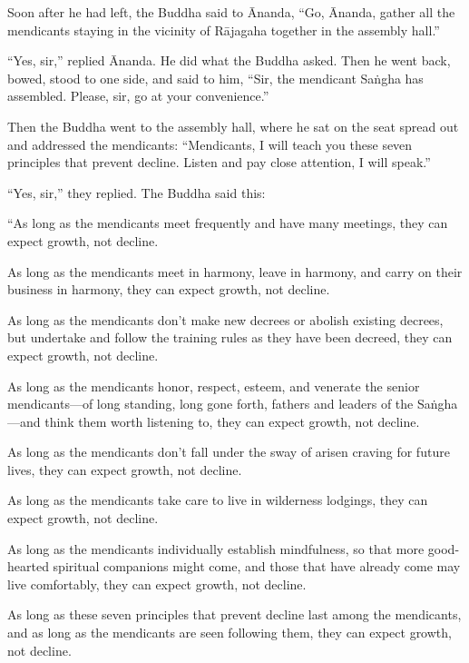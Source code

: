 \documentclass[12pt,openany]{book}%
\begin{document}
Soon after he had left, the Buddha said to Ānanda, “Go, Ānanda, gather all the mendicants staying in the vicinity of \textsanskrit{Rājagaha} together in the assembly hall.” 

“Yes, sir,” replied Ānanda. He did what the Buddha asked. Then he went back, bowed, stood to one side, and said to him, “Sir, the mendicant \textsanskrit{Saṅgha} has assembled. Please, sir, go at your convenience.” 

Then the Buddha went to the assembly hall, where he sat on the seat spread out and addressed the mendicants: “Mendicants, I will teach you these seven principles that prevent decline. Listen and pay close attention, I will speak.” 

“Yes, sir,” they replied. The Buddha said this: 

“As long as the mendicants meet frequently and have many meetings, they can expect growth, not decline. 

As long as the mendicants meet in harmony, leave in harmony, and carry on their business in harmony, they can expect growth, not decline. 

As long as the mendicants don’t make new decrees or abolish existing decrees, but undertake and follow the training rules as they have been decreed, they can expect growth, not decline. 

As long as the mendicants honor, respect, esteem, and venerate the senior mendicants—of long standing, long gone forth, fathers and leaders of the \textsanskrit{Saṅgha}—and think them worth listening to, they can expect growth, not decline. 

As long as the mendicants don’t fall under the sway of arisen craving for future lives, they can expect growth, not decline. 

As long as the mendicants take care to live in wilderness lodgings, they can expect growth, not decline. 

As long as the mendicants individually establish mindfulness, so that more good-hearted spiritual companions might come, and those that have already come may live comfortably, they can expect growth, not decline. 

As long as these seven principles that prevent decline last among the mendicants, and as long as the mendicants are seen following them, they can expect growth, not decline. 
\end{document}
